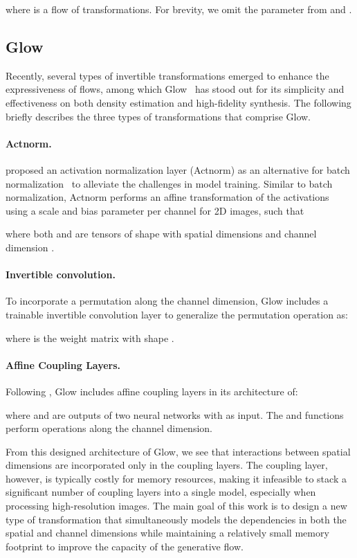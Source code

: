 \documentclass{article}
\begin{document}
where  is a flow of  transformations.
For brevity, we omit the parameter  from  and .

\subsection{Glow}
Recently, several types of invertible transformations emerged to enhance the expressiveness of flows, among which Glow~\citep{kingma2018glow} has stood out for its simplicity and effectiveness on both density estimation and high-fidelity synthesis.
The following briefly describes the three types of transformations that comprise Glow.

\paragraph{Actnorm.} \citet{kingma2018glow} proposed an activation normalization layer (Actnorm) as an alternative for batch normalization~\citep{ioffe2015batch} to alleviate the challenges in model training.
Similar to batch normalization, Actnorm performs an affine transformation of the activations using a scale and bias parameter per channel for 2D images, such that

where both  and  are tensors of shape  with spatial dimensions  and channel dimension .

\paragraph{Invertible  convolution.} To incorporate a permutation along the channel dimension, Glow includes a trainable invertible  convolution layer to generalize the permutation operation as:

where  is the weight matrix with shape .

\paragraph{Affine Coupling Layers.} Following \citet{dinh2016density}, Glow includes affine coupling layers in its architecture of:

where  and  are outputs of two neural networks with  as input.
The  and  functions perform operations along the channel dimension.

From this designed architecture of Glow, we see that interactions between spatial dimensions are incorporated only in the coupling layers.
The coupling layer, however, is typically costly for memory resources, making it infeasible to stack a significant number of coupling layers into a single model, especially when processing high-resolution images.
The main goal of this work is to design a new type of transformation that simultaneously models the dependencies in both the spatial and channel dimensions while maintaining a relatively small memory footprint to improve the capacity of the generative flow.
\end{document}
